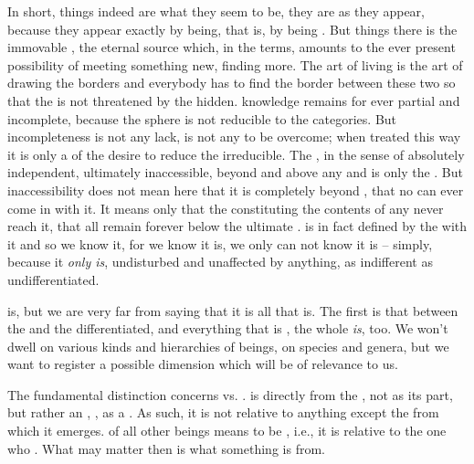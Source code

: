 \pa\label{pa:IndistinctNeedsNo} In short, things indeed are what they seem to be, they are as they appear,
because they appear exactly by being, that is, by being . But
 things there is the immovable , the eternal source which,
in the  terms, amounts to the ever present possibility of meeting
something new, finding more.  The art of living is the art of drawing the
borders and everybody has to find the border between these two  so
that the  is not threatened by the hidden.  knowledge
remains for ever partial and incomplete, because the  sphere is
not reducible to the  categories. But incompleteness is
not any lack, is not any  to be overcome; when treated this
way it is only a  of the desire to reduce the irreducible.  The
, in the sense of absolutely independent, ultimately
inaccessible, beyond and above any  and  is only
the .  But inaccessibility does not mean here that
it is completely beyond , that no  can ever come in
  with it.  It means only that the 
constituting the contents of any  never reach it, that all
 remain forever below the ultimate .   is in
fact defined by the  with it and so we know it, for we know
 it is, we only can not know  it is -- simply, because it
{\em only is}, undisturbed and unaffected by anything, as indifferent as
undifferentiated.



\label{asymm} \pa\label{asymBeing}  is,
but we are very far from saying that it is all that is. The first
 is that between the  and the differentiated, and
everything that is , the whole  {\em is},
too.  We won't dwell on various kinds and hierarchies of beings, on species and
genera, but we want to register a possible dimension which will be of relevance
to us.

The fundamental distinction concerns  vs. .
 is  directly from the , not as its part,
but rather an , , as a . As such, it is not
relative to anything except the  from which it emerges.  of
all other beings means to be , i.e., it is relative to the one
who . What may matter then is what something is
 from.

